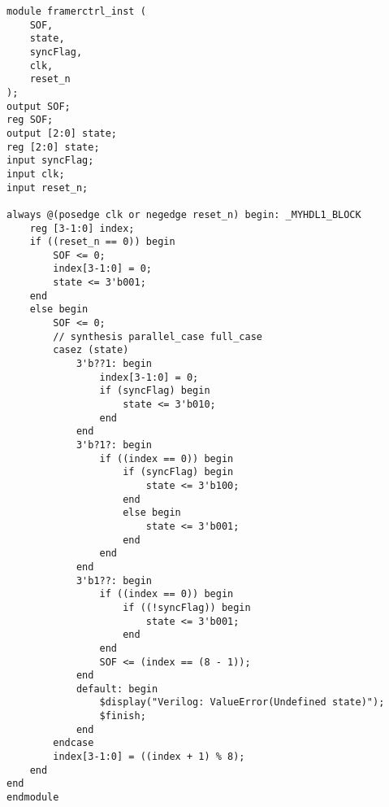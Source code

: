 \begin{verbatim}
module framerctrl_inst (
    SOF,
    state,
    syncFlag,
    clk,
    reset_n
);
output SOF;
reg SOF;
output [2:0] state;
reg [2:0] state;
input syncFlag;
input clk;
input reset_n;

always @(posedge clk or negedge reset_n) begin: _MYHDL1_BLOCK
    reg [3-1:0] index;
    if ((reset_n == 0)) begin
        SOF <= 0;
        index[3-1:0] = 0;
        state <= 3'b001;
    end
    else begin
        SOF <= 0;
        // synthesis parallel_case full_case
        casez (state)
            3'b??1: begin
                index[3-1:0] = 0;
                if (syncFlag) begin
                    state <= 3'b010;
                end
            end
            3'b?1?: begin
                if ((index == 0)) begin
                    if (syncFlag) begin
                        state <= 3'b100;
                    end
                    else begin
                        state <= 3'b001;
                    end
                end
            end
            3'b1??: begin
                if ((index == 0)) begin
                    if ((!syncFlag)) begin
                        state <= 3'b001;
                    end
                end
                SOF <= (index == (8 - 1));
            end
            default: begin
                $display("Verilog: ValueError(Undefined state)");
                $finish;
            end
        endcase
        index[3-1:0] = ((index + 1) % 8);
    end
end
endmodule
\end{verbatim}


